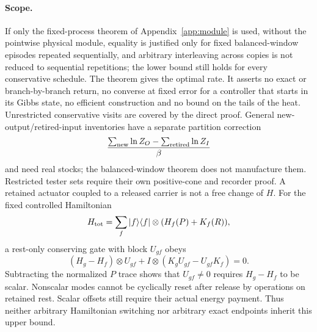 \paragraph{Scope.}
If only the fixed-process theorem of Appendix~\ref{app:module} is used, without the pointwise physical module, equality is justified only for fixed balanced-window episodes repeated sequentially, and arbitrary interleaving across copies is not reduced to sequential repetitions; the lower bound still holds for every conservative schedule. The theorem gives the optimal rate. It asserts no exact or branch-by-branch return, no converse at fixed error for a controller that starts in its Gibbs state, no efficient construction and no bound on the tails of the heat. Unrestricted conservative visits are covered by the direct proof. General new-output/retired-input inventories have a separate partition correction
\[
\frac{\sum_{\rm new}\ln Z_O-\sum_{\rm retired}\ln Z_I}{\beta}
\]
and need real stocks; the balanced-window theorem does not manufacture them. Restricted tester sets require their own positive-cone and recorder proof. A retained actuator coupled to a released carrier is not a free change of $H$. For the fixed controlled Hamiltonian
\[
H_{\rm tot}=\sum_f|f\rangle\langle f|\otimes(H_f(P)+K_f(R)),
\]
a rest-only conserving gate with block $U_{gf}$ obeys
\[
(H_g-H_f)\otimes U_{gf}+I\otimes(K_gU_{gf}-U_{gf}K_f)=0.
\]
Subtracting the normalized $P$ trace shows that $U_{gf}\ne0$ requires $H_g-H_f$ to be scalar. Nonscalar modes cannot be cyclically reset after release by operations on retained rest. Scalar offsets still require their actual energy payment. Thus neither arbitrary Hamiltonian switching nor arbitrary exact endpoints inherit this upper bound.

